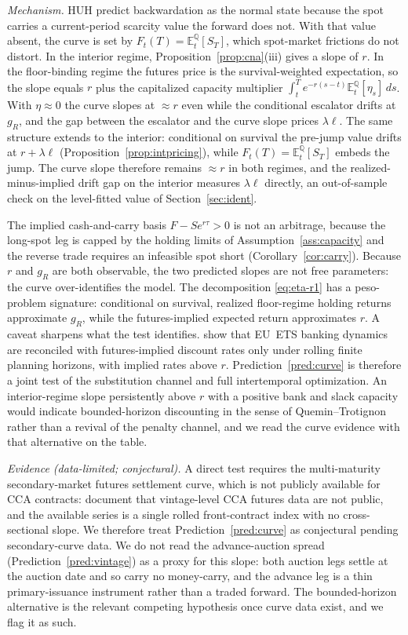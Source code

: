 \documentclass[11pt,letterpaper]{article}
\theoremstyle{plain}
\theoremstyle{definition}
\newcommand{\E}{\mathbb{E}}                  %
\newcommand{\Qmeasure}{\mathbb{Q}}           %
\numberwithin{equation}{section}
\begin{document}
\noindent\emph{Mechanism.} HUH predict backwardation as the normal state because the spot carries a current-period scarcity value the forward does not. With that value absent, the curve is set by $F_t(T)=\E_t^{\Qmeasure}[S_T]$, which spot-market frictions do not distort. In the interior regime, Proposition~\ref{prop:cna}(iii) gives a slope of $r$. In the floor-binding regime the futures price is the survival-weighted expectation, so the slope equals $r$ plus the capitalized capacity multiplier $\int_t^Te^{-r(s-t)}\E_t^\Qmeasure[\eta_s]\,ds$. With $\eta\approx0$ the curve slopes at $\approx r$ even while the conditional escalator drifts at $g_R$, and the gap between the escalator and the curve slope prices $\lambda\ell$. The same structure extends to the interior: conditional on survival the pre-jump value drifts at $r+\lambda\ell$ (Proposition~\ref{prop:intpricing}), while $F_t(T)=\E_t^{\Qmeasure}[S_T]$ embeds the jump. The curve slope therefore remains $\approx r$ in both regimes, and the realized-minus-implied drift gap on the interior measures $\lambda\ell$ directly, an out-of-sample check on the level-fitted value of Section~\ref{sec:ident}.

The implied cash-and-carry basis $F-Se^{r\tau}>0$ is not an arbitrage, because the long-spot leg is capped by the holding limits of Assumption~\ref{ass:capacity} and the reverse trade requires an infeasible spot short (Corollary~\ref{cor:carry}). Because $r$ and $g_R$ are both observable, the two predicted slopes are not free parameters: the curve over-identifies the model. The decomposition \eqref{eq:eta-r1} has a peso-problem signature: conditional on survival, realized floor-regime holding returns approximate $g_R$, while the futures-implied expected return approximates $r$. A caveat sharpens what the test identifies. \citet{quemin2021} show that EU~ETS banking dynamics are reconciled with futures-implied discount rates only under rolling finite planning horizons, with implied rates above $r$. Prediction~\ref{pred:curve} is therefore a joint test of the substitution channel and full intertemporal optimization. An interior-regime slope persistently above $r$ with a positive bank and slack capacity would indicate bounded-horizon discounting in the sense of Quemin--Trotignon rather than a revival of the penalty channel, and we read the curve evidence with that alternative on the table.

\emph{Evidence (data-limited; conjectural).} A direct test requires the multi-maturity secondary-market futures settlement curve, which is not publicly available for CCA contracts: \citet{shi2023} document that vintage-level CCA
futures data are not public, and the available series is a single rolled front-contract index with no cross-sectional slope. We therefore treat Prediction~\ref{pred:curve} as conjectural pending secondary-curve data. We do not read the advance-auction spread (Prediction~\ref{pred:vintage}) as a proxy for this slope: both auction legs settle at the auction date and so carry no money-carry, and the advance leg is a thin primary-issuance instrument rather than a traded forward. The \citet{quemin2021} bounded-horizon alternative is the relevant competing hypothesis once curve data exist, and we flag it as such.
\end{document}
